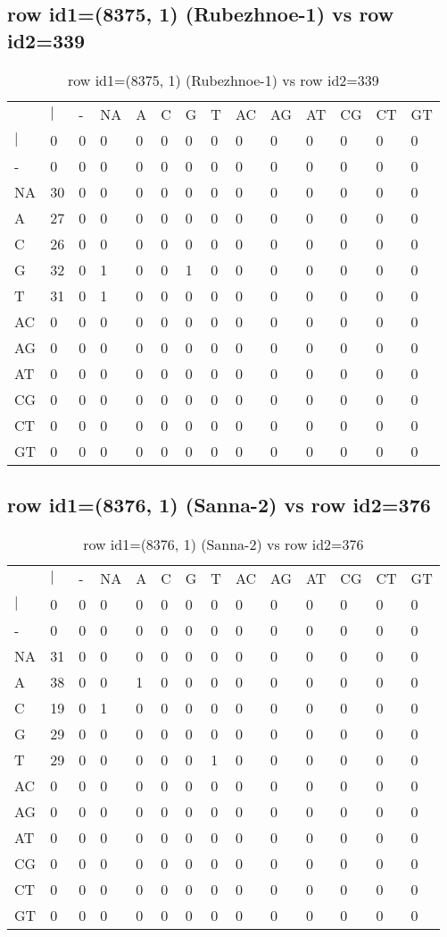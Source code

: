 \subsection{row id1=(8375, 1) (Rubezhnoe-1) vs row id2=339}
\begin{center}
\begin{longtable}{|l|l|l|l|l|l|l|l|l|l|l|l|l|l|}
\caption{row id1=(8375, 1) (Rubezhnoe-1) vs row id2=339} \label{table_dm418}\\
\hline
\\
\hline
&$|$&-&NA&A&C&G&T&AC&AG&AT&CG&CT&GT\\
$|$&0&0&0&0&0&0&0&0&0&0&0&0&0\\
-&0&0&0&0&0&0&0&0&0&0&0&0&0\\
NA&30&0&0&0&0&0&0&0&0&0&0&0&0\\
A&27&0&0&0&0&0&0&0&0&0&0&0&0\\
C&26&0&0&0&0&0&0&0&0&0&0&0&0\\
G&32&0&1&0&0&1&0&0&0&0&0&0&0\\
T&31&0&1&0&0&0&0&0&0&0&0&0&0\\
AC&0&0&0&0&0&0&0&0&0&0&0&0&0\\
AG&0&0&0&0&0&0&0&0&0&0&0&0&0\\
AT&0&0&0&0&0&0&0&0&0&0&0&0&0\\
CG&0&0&0&0&0&0&0&0&0&0&0&0&0\\
CT&0&0&0&0&0&0&0&0&0&0&0&0&0\\
GT&0&0&0&0&0&0&0&0&0&0&0&0&0\\
\hline
\end{longtable}
\end{center}

\subsection{row id1=(8376, 1) (Sanna-2) vs row id2=376}
\begin{center}
\begin{longtable}{|l|l|l|l|l|l|l|l|l|l|l|l|l|l|}
\caption{row id1=(8376, 1) (Sanna-2) vs row id2=376} \label{table_dm420}\\
\hline
\\
\hline
&$|$&-&NA&A&C&G&T&AC&AG&AT&CG&CT&GT\\
$|$&0&0&0&0&0&0&0&0&0&0&0&0&0\\
-&0&0&0&0&0&0&0&0&0&0&0&0&0\\
NA&31&0&0&0&0&0&0&0&0&0&0&0&0\\
A&38&0&0&1&0&0&0&0&0&0&0&0&0\\
C&19&0&1&0&0&0&0&0&0&0&0&0&0\\
G&29&0&0&0&0&0&0&0&0&0&0&0&0\\
T&29&0&0&0&0&0&1&0&0&0&0&0&0\\
AC&0&0&0&0&0&0&0&0&0&0&0&0&0\\
AG&0&0&0&0&0&0&0&0&0&0&0&0&0\\
AT&0&0&0&0&0&0&0&0&0&0&0&0&0\\
CG&0&0&0&0&0&0&0&0&0&0&0&0&0\\
CT&0&0&0&0&0&0&0&0&0&0&0&0&0\\
GT&0&0&0&0&0&0&0&0&0&0&0&0&0\\
\hline
\end{longtable}
\end{center}

